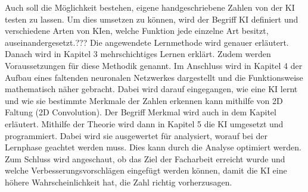 \documentclass[11pt]{article}
\begin{document}
Auch soll die Möglichkeit bestehen, eigene handgeschriebene Zahlen von der KI testen zu lassen. Um dies umsetzen zu können, wird der Begriff KI definiert und
verschiedene Arten von KIen, welche Funktion jede einzelne Art besitzt, auseinandergesetzt.??? Die angewendete Lernmethode wird genauer erläutert.
Danach wird in Kapitel 3 mehrschichtiges Lernen erklärt. Zudem werden Voraussetzungen für diese Methodik genannt. Im Anschluss wird in Kapitel 4
der Aufbau eines faltenden neuronalen Netzwerkes dargestellt und die Funktionsweise mathematisch näher gebracht. Dabei wird darauf eingegangen, wie eine KI
lernt und wie sie bestimmte Merkmale der Zahlen erkennen kann mithilfe von 2D Faltung (2D Convolution). Der Begriff Merkmal wird auch in dem Kapitel erläutert.
Mithilfe der Theorie wird dann in Kapitel 5 die KI umgesetzt und programmiert. Dabei wird sie ausgewertet für analysiert, worauf bei der Lernphase
geachtet werden muss. Dies kann durch die Analyse optimiert werden. Zum Schluss wird angeschaut, ob das Ziel der Facharbeit erreicht wurde und welche
Verbesserungsvorschlägen eingefügt werden können, damit die KI eine höhere Wahrscheinlichkeit hat, die Zahl richtig vorherzusagen.
\end{document}

